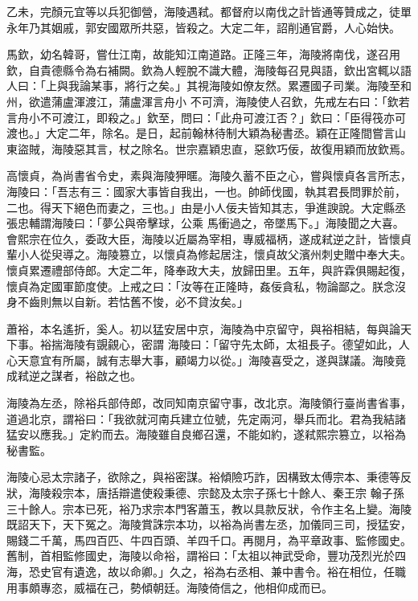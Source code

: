 \begin{pinyinscope}
 乙未，完顏元宜等以兵犯御營，海陵遇弒。都督府以南伐之計皆通等贊成之，徒單永年乃其姻戚，郭安國眾所共惡，皆殺之。大定二年，詔削通官爵，人心始快。



 馬欽，幼名韓哥，嘗仕江南，故能知江南道路。正隆三年，海陵將南伐，遂召用欽，自貴德縣令為右補闕。欽為人輕脫不識大體，海陵每召見與語，欽出宮輒以語人曰：「上與我論某事，將行之矣。」其視海陵如僚友然。累遷國子司業。海陵至和州，欲遣蒲盧渾渡江，蒲盧渾言舟小
 不可濟，海陵使人召欽，先戒左右曰：「欽若言舟小不可渡江，即殺之。」欽至，問曰：「此舟可渡江否？」欽曰：「臣得筏亦可渡也。」大定二年，除名。是日，起前翰林待制大穎為秘書丞。穎在正隆間嘗言山東盜賊，海陵惡其言，杖之除名。世宗嘉穎忠直，惡欽巧佞，故復用穎而放欽焉。



 高懷貞，為尚書省令史，素與海陵狎暱。海陵久蓄不臣之心，嘗與懷貞各言所志，海陵曰：「吾志有三：國家大事皆自我出，一也。帥師伐國，執其君長問罪於前，二也。得天下絕色而妻之，三也。」由是小人佞夫皆知其志，爭進諛說。大定縣丞張忠輔謂海陵曰：「夢公與帝擊球，公乘
 馬衝過之，帝墜馬下。」海陵聞之大喜。會熙宗在位久，委政大臣，海陵以近屬為宰相，專威福柄，遂成弒逆之計，皆懷貞輩小人從臾導之。海陵篡立，以懷貞為修起居注，懷貞故父濱州刺史贈中奉大夫。懷貞累遷禮部侍郎。大定二年，降奉政大夫，放歸田里。五年，與許霖俱賜起復，懷貞為定國軍節度使。上戒之曰：「汝等在正隆時，姦佞貪私，物論鄙之。朕念沒身不齒則無以自新。若怙舊不悛，必不貸汝矣。」



 蕭裕，本名遙折，奚人。初以猛安居中京，海陵為中京留守，與裕相結，每與論天下事。裕揣海陵有覬覦心，密謂
 海陵曰：「留守先太師，太祖長子。德望如此，人心天意宜有所屬，誠有志舉大事，顧竭力以從。」海陵喜受之，遂與謀議。海陵竟成弒逆之謀者，裕啟之也。



 海陵為左丞，除裕兵部侍郎，改同知南京留守事，改北京。海陵領行臺尚書省事，道過北京，謂裕曰：「我欲就河南兵建立位號，先定兩河，舉兵而北。君為我結諸猛安以應我。」定約而去。海陵雖自良鄉召還，不能如約，遂弒熙宗篡立，以裕為秘書監。



 海陵心忌太宗諸子，欲除之，與裕密謀。裕傾險巧詐，因構致太傅宗本、秉德等反狀，海陵殺宗本，唐括辯遣使殺秉德、宗懿及太宗子孫七十餘人、秦王宗
 翰子孫三十餘人。宗本已死，裕乃求宗本門客蕭玉，教以具款反狀，令作主名上變。海陵既詔天下，天下冤之。海陵賞誅宗本功，以裕為尚書左丞，加儀同三司，授猛安，賜錢二千萬，馬四百匹、牛四百頭、羊四千口。再閱月，為平章政事、監修國史。舊制，首相監修國史，海陵以命裕，謂裕曰：「太祖以神武受命，豐功茂烈光於四海，恐史官有遺逸，故以命卿。」久之，裕為右丞相、兼中書令。裕在相位，任職用事頗專恣，威福在己，勢傾朝廷。海陵倚信之，他相仰成而已。




\end{pinyinscope}
